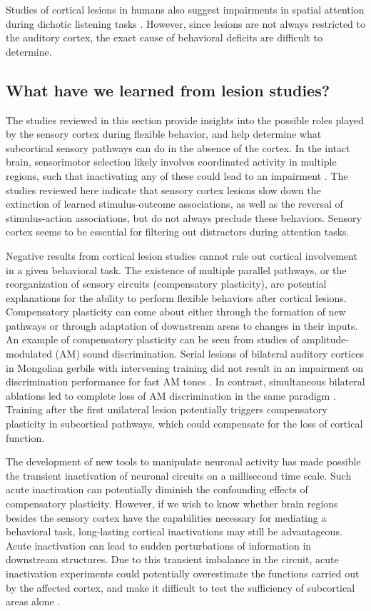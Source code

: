 Studies of cortical lesions in humans also suggest impairments in spatial attention during dichotic listening tasks \citep{Woods1993, Bellmann2001}. However, since lesions are not always restricted to the auditory cortex, the exact cause of behavioral deficits are difficult to determine. 

\subsection{What have we learned from lesion studies?}
The studies reviewed in this section provide insights into the possible roles played by the sensory cortex during flexible behavior, and help determine what subcortical sensory pathways can do in the absence of the cortex.
% 
In the intact brain, sensorimotor selection likely involves coordinated activity in multiple regions, such that inactivating any of these could lead to an impairment \citep{Du2011}. The studies reviewed here indicate that sensory cortex lesions slow down the extinction of learned stimulus-outcome associations, as well as the reversal of stimulus-action associations, but do not always preclude these behaviors. Sensory cortex seems to be essential for filtering out distractors during attention tasks. 

Negative results from cortical lesion studies cannot rule out cortical involvement in a given behavioral task. The existence of multiple parallel pathways, or the reorganization of sensory circuits (compensatory plasticity), are potential explanations for the ability to perform flexible behaviors after cortical lesions. Compensatory plasticity can come about either through the formation of new pathways or through adaptation of downstream areas to changes in their inputs. An example of compensatory plasticity can be seen from studies of amplitude-modulated (AM) sound discrimination. Serial lesions of bilateral auditory cortices in Mongolian gerbils with intervening training did not result in an impairment on discrimination performance for fast AM tones \citep{Depner2014}. In contrast, simultaneous bilateral ablations led to complete loss of AM discrimination in the same paradigm \citep{Deutscher2006}. Training after the first unilateral lesion potentially triggers compensatory plasticity in subcortical pathways, which could compensate for the loss of cortical function. 

The development of new tools to manipulate neuronal activity has made possible the transient inactivation of neuronal circuits on a millisecond time scale. Such acute inactivation can potentially diminish the confounding effects of compensatory plasticity. However, if we wish to know whether brain regions besides the sensory cortex have the capabilities necessary for mediating a behavioral task, long-lasting cortical inactivations may still be advantageous. Acute inactivation can lead to sudden perturbations of information in downstream structures. Due to this transient imbalance in the circuit, acute inactivation experiments could potentially overestimate the functions carried out by the affected cortex, and make it difficult to test the sufficiency of subcortical areas alone \citep{Otchy2015}.

